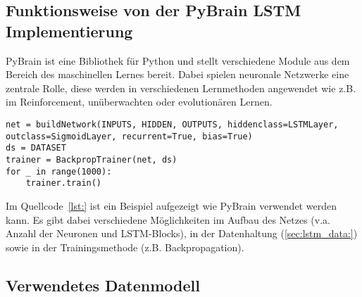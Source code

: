 \subsection{Funktionsweise von der \acs{PyBrain} \acs{LSTM} Implementierung}
\ac{PyBrain}\cite{schaul2010} ist eine Bibliothek für Python und stellt
verschiedene Module aus dem Bereich des maschinellen Lernes bereit. Dabei
spielen neuronale Netzwerke eine zentrale Rolle, diese werden in verschiedenen
Lernmethoden angewendet wie z.B. im Reinforcement, unüberwachten oder
evolutionären Lernen.

\begin{lstlisting}
net = buildNetwork(INPUTS, HIDDEN, OUTPUTS, hiddenclass=LSTMLayer, outclass=SigmoidLayer, recurrent=True, bias=True) 
ds = DATASET 
trainer = BackpropTrainer(net, ds)
for _ in range(1000):
    trainer.train()
\end{lstlisting}
 
Im Quellcode~\ref{lst:} ist ein Beispiel aufgezeigt wie \ac{PyBrain} verwendet
werden kann. Es gibt dabei verschiedene Möglichkeiten im Aufbau des Netzes
(v.a. Anzahl der Neuronen und \ac{LSTM}-Blocks), in der Datenhaltung
(\ref{sec:lstm_data:}) sowie in der Trainingsmethode (z.B. Backpropagation). 
\subsection{Verwendetes Datenmodell}
\label{sec:lstm_data}
 
\nocite{GERS2001,WIKI2013,Schmidhuber2013,LSTM1,Nerbonne1}
